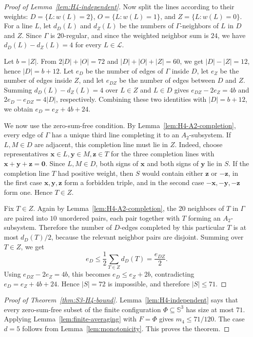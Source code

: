 \documentclass[11pt]{article}
\theoremstyle{definition}
\begin{document}
\begin{proof}[Proof of Lemma~\ref{lem:H4-independent}]
Now split the lines according to their weights:
\(D=\{L:w(L)=2\}\), \(O=\{L:w(L)=1\}\), and \(Z=\{L:w(L)=0\}\).
For a line \(L\), let \(d_{D}(L)\) and \(d_{Z}(L)\) be the numbers of
\(\Gamma\)-neighbors of \(L\) in \(D\) and \(Z\).  Since \(\Gamma\) is
\(20\)-regular, and since the weighted neighbor sum is \(24\), we have
\(d_{D}(L)-d_{Z}(L)=4\) for every \(L\in\mathcal L\).

Let \(b=|Z|\).  From \(2|D|+|O|=72\) and
\(|D|+|O|+|Z|=60\), we get \(|D|-|Z|=12\), hence \(|D|=b+12\).
Let \(e_{D}\) be the number of edges of \(\Gamma\) inside \(D\), let \(e_{Z}\)
be the number of edges inside \(Z\), and let \(e_{DZ}\) be the number of
edges between \(D\) and \(Z\).  Summing \(d_{D}(L)-d_{Z}(L)=4\) over
\(L\in Z\) and \(L\in D\) gives \(e_{DZ}-2e_{Z}=4b\) and
\(2e_{D}-e_{DZ}=4|D|\), respectively.  Combining these two identities with
\(|D|=b+12\), we obtain \(e_{D}=e_{Z}+4b+24\).

We now use the zero-sum-free condition.  By
Lemma~\ref{lem:H4-A2-completion}, every edge of \(\Gamma\) has a unique
third line completing it to an \(A_{2}\)-subsystem.  If \(L,M\in D\) are
adjacent, this completion line must lie in \(Z\).
Indeed, choose representatives
\(\boldsymbol{x}\in L,\boldsymbol{y}\in M,\boldsymbol{z}\in T\) for the
three completion lines with
\(\boldsymbol{x}+\boldsymbol{y}+\boldsymbol{z}=\boldsymbol{0}\).  Since
\(L,M\in D\), both signs of \(\boldsymbol{x}\) and both signs of
\(\boldsymbol{y}\) lie in \(S\).  If the completion line \(T\) had
positive weight, then \(S\) would contain either \(\boldsymbol{z}\) or
\(-\boldsymbol{z}\), in the first case
\(\boldsymbol{x},\boldsymbol{y},\boldsymbol{z}\) form a forbidden triple,
and in the second case
\(-\boldsymbol{x},-\boldsymbol{y},-\boldsymbol{z}\) form one.  Hence
\(T\in Z\).

Fix \(T\in Z\).  Again by Lemma~\ref{lem:H4-A2-completion}, the \(20\)
neighbors of \(T\) in \(\Gamma\) are paired into \(10\) unordered pairs,
each pair together with \(T\) forming an \(A_{2}\)-subsystem.  Therefore the
number of \(D\)-edges completed by this particular \(T\) is at most
\(d_{D}(T)/2\), because the relevant neighbor pairs are disjoint.  Summing
over \(T\in Z\), we get
\[
    e_{D}\le\frac{1}{2}\sum_{T\in Z}d_{D}(T)=\frac{e_{DZ}}{2}.
\]
Using \(e_{DZ}-2e_{Z}=4b\), this becomes \(e_{D}\le e_{Z}+2b\), contradicting
\(e_{D}=e_{Z}+4b+24\).  Hence \(|S|=72\) is impossible, and therefore
\(|S|\le 71\).
\end{proof}

\begin{proof}[Proof of Theorem~\ref{thm:S3-H4-bound}]
Lemma~\ref{lem:H4-independent} says that every zero-sum-free subset of the
finite configuration \(\Phi\subseteq\mathbb S^{3}\) has size at most \(71\).
Applying Lemma~\ref{lem:finite-averaging} with \(F=\Phi\) gives
\(m_{4}\le71/120\).  The case \(d=5\) follows from
Lemma~\ref{lem:monotonicity}.  This proves the theorem.
\end{proof}
\end{document}
